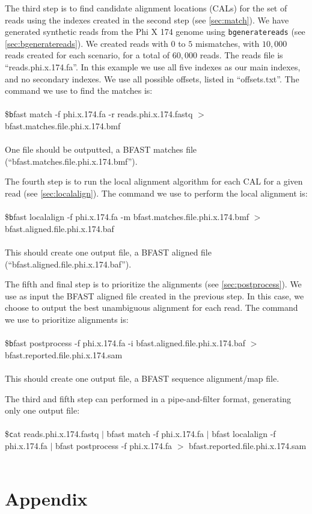 \documentclass[a4paper,12pt]{book}
\newcommand{\TT}[1]{{\tt #1}} %
\newenvironment{script}{\\\\\footnotesize\$\TT}{\normalsize\\\\}
\newcommand{\BMF}{BFAST matches file} %
\newcommand{\BAF}{BFAST aligned file} %
\newcommand{\BSAMF}{BFAST sequence alignment/map file} %
\begin{document}
The third step is to find candidate alignment locations (CALs) for the set of reads using the indexes created in the second step (see \autoref{sec:match}).
We have generated synthetic reads from the Phi X 174 genome using \TT{bgeneratereads} (see \autoref{sec:bgeneratereads}).
We created reads with $0$ to $5$ mismatches, with $10,000$ reads created for each scenario, for a total of $60,000$ reads.
The reads file is ``reads.phi.x.174.fa''.
In this example we use all five indexes as our main indexes, and no secondary indexes.
We use all possible offsets, listed in ``offsets.txt''.
The command we use to find the matches is:
\begin{script}
	bfast match -f phi.x.174.fa -r reads.phi.x.174.fastq $>$  bfast.matches.file.phi.x.174.bmf
\end{script}
One file should be outputted, a \BMF{} (``bfast.matches.file.phi.x.174.bmf'').

The fourth step is to run the local alignment algorithm for each CAL for a given read (see \autoref{sec:localalign}).
The command we use to perform the local alignment is:
\begin{script}
	bfast localalign -f phi.x.174.fa -m bfast.matches.file.phi.x.174.bmf $>$ bfast.aligned.file.phi.x.174.baf
\end{script}
This should create one output file, a \BAF{} (``bfast.aligned.file.phi.x.174.baf'').

The fifth and final step is to prioritize the alignments (see \autoref{sec:postprocess}).
We use as input the \BAF{} created in the previous step.
In this case, we choose to output the best unambiguous alignment for each read.
The command we use to prioritize alignments is:
\begin{script}
	bfast postprocess -f phi.x.174.fa -i bfast.aligned.file.phi.x.174.baf $>$ bfast.reported.file.phi.x.174.sam
\end{script}
This should create one output file, a \BSAMF{}.

The third and fifth step can performed in a pipe-and-filter format, generating only one output file:
\begin{script}
	cat reads.phi.x.174.fastq $|$ bfast match -f phi.x.174.fa $|$ bfast localalign -f phi.x.174.fa $|$ bfast postprocess -f phi.x.174.fa $>$ bfast.reported.file.phi.x.174.sam
\end{script}
\chapter{Appendix}
\end{document}
